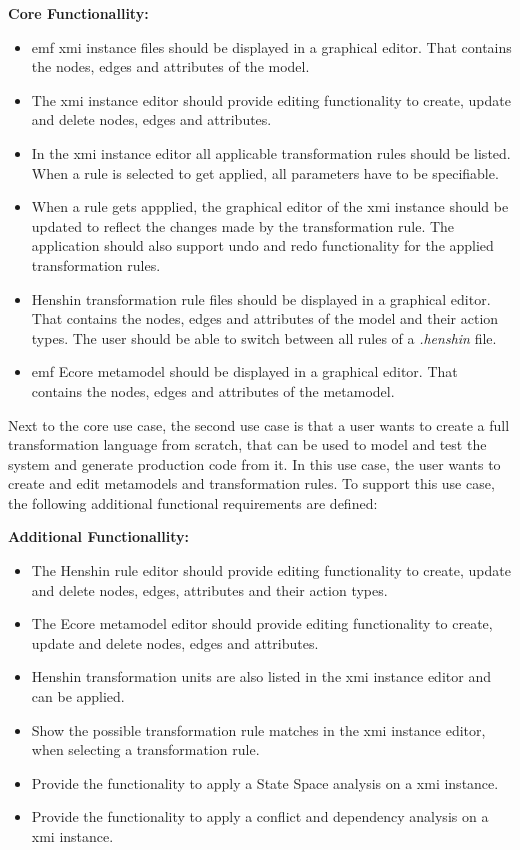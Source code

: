   \textbf{Core Functionallity:}
  \begin{itemize}
    \item \ac{emf} \ac{xmi} instance files should be displayed in a graphical editor. That contains the nodes, edges and attributes of the model.
    \item The \ac{xmi} instance editor should provide editing functionality to create, update and delete nodes, edges and attributes.
    \item In the \ac{xmi} instance editor all applicable transformation rules should be listed.  When a rule is selected to get applied, all parameters have to be specifiable.
    \item When a rule gets appplied, the graphical editor of the \ac{xmi} instance should be updated to reflect the changes made by the transformation rule. The application should also support undo and redo functionality for the applied transformation rules.
    \item Henshin transformation rule files should be displayed in a graphical editor. That contains the nodes, edges and attributes of the model and their action types. The user should be able to switch between all rules of a \textit{.henshin} file.
    \item \ac{emf} Ecore metamodel should be displayed in a graphical editor. That contains the nodes, edges and attributes of the metamodel.
\end{itemize}

Next to the core use case, the second use case is that a user wants to create a full transformation language from scratch, that can be used to model and test the system and generate production code from it. In this use case, the user wants to create and edit metamodels and transformation rules. To support this use case, the following additional functional requirements are defined:

\textbf{Additional Functionallity:}
  \begin{itemize}
    \item The Henshin rule editor should provide editing functionality to create, update and delete nodes, edges, attributes and their action types.
    \item The Ecore metamodel editor should provide editing functionality to create, update and delete nodes, edges and attributes.
    \item Henshin transformation units are also listed in the \ac{xmi} instance editor and can be applied.
    \item Show the possible transformation rule matches in the \ac{xmi} instance editor, when selecting a transformation rule.
    \item Provide the functionality to apply a State Space analysis on a \ac{xmi} instance.
    \item Provide the functionality to apply a conflict and dependency analysis on a \ac{xmi} instance. 
  \end{itemize}


